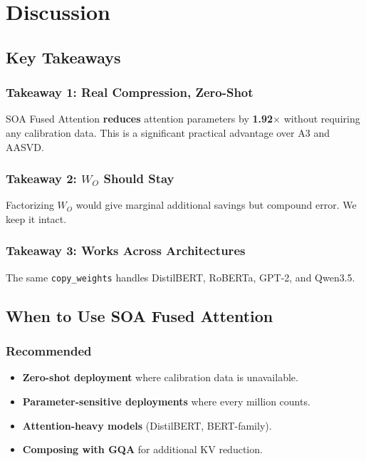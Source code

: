 \section{Discussion}

\subsection{Key Takeaways}

\subsubsection{Takeaway 1: Real Compression, Zero-Shot}

SOA Fused Attention \textbf{reduces} attention parameters by \textbf{1.92$\times$} 
without requiring any calibration data. This is a significant practical 
advantage over A3 and AASVD.

\subsubsection{Takeaway 2: $W_O$ Should Stay}

Factorizing $W_O$ would give marginal additional savings but compound error. 
We keep it intact.

\subsubsection{Takeaway 3: Works Across Architectures}

The same \texttt{copy\_weights} handles DistilBERT, RoBERTa, GPT-2, and Qwen3.5.

\subsection{When to Use SOA Fused Attention}

\subsubsection{Recommended}
\begin{itemize}
\item \textbf{Zero-shot deployment} where calibration data is unavailable.
\item \textbf{Parameter-sensitive deployments} where every million counts.
\item \textbf{Attention-heavy models} (DistilBERT, BERT-family).
\item \textbf{Composing with GQA} for additional KV reduction.

\end{itemize}

